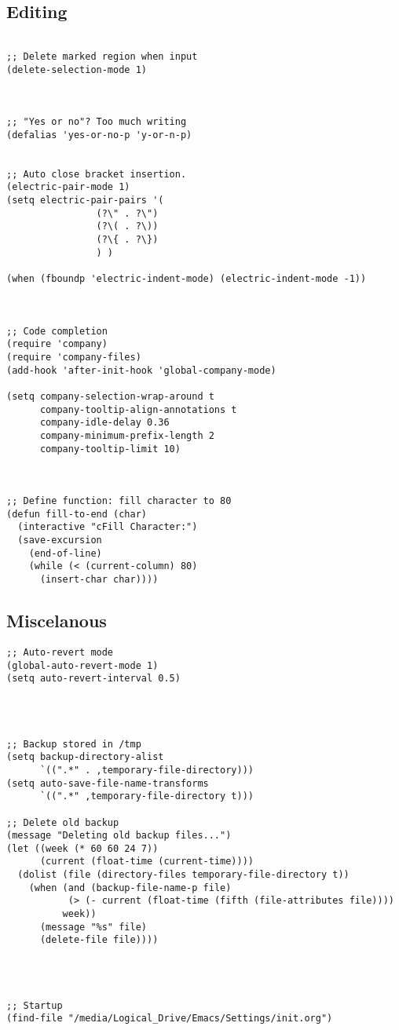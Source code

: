 \documentclass[11pt]{article}
\begin{document}
\subsection*{Editing}
\label{sec:orga114509}

\begin{verbatim}

;; Delete marked region when input
(delete-selection-mode 1)



;; "Yes or no"? Too much writing
(defalias 'yes-or-no-p 'y-or-n-p)


;; Auto close bracket insertion.
(electric-pair-mode 1)
(setq electric-pair-pairs '(
			    (?\" . ?\")
			    (?\( . ?\))
			    (?\{ . ?\})
			    ) )

(when (fboundp 'electric-indent-mode) (electric-indent-mode -1))



;; Code completion
(require 'company)
(require 'company-files)
(add-hook 'after-init-hook 'global-company-mode)

(setq company-selection-wrap-around t
      company-tooltip-align-annotations t
      company-idle-delay 0.36
      company-minimum-prefix-length 2
      company-tooltip-limit 10)



;; Define function: fill character to 80
(defun fill-to-end (char)
  (interactive "cFill Character:")
  (save-excursion
    (end-of-line)
    (while (< (current-column) 80)
      (insert-char char))))

\end{verbatim}

\subsection*{Miscelanous}
\label{sec:org066f88e}
\begin{verbatim}
;; Auto-revert mode
(global-auto-revert-mode 1)
(setq auto-revert-interval 0.5)




;; Backup stored in /tmp
(setq backup-directory-alist
      `((".*" . ,temporary-file-directory)))
(setq auto-save-file-name-transforms
      `((".*" ,temporary-file-directory t)))

;; Delete old backup
(message "Deleting old backup files...")
(let ((week (* 60 60 24 7))
      (current (float-time (current-time))))
  (dolist (file (directory-files temporary-file-directory t))
    (when (and (backup-file-name-p file)
	       (> (- current (float-time (fifth (file-attributes file))))
		  week))
      (message "%s" file)
      (delete-file file))))




;; Startup
(find-file "/media/Logical_Drive/Emacs/Settings/init.org")

\end{verbatim}
\end{document}
